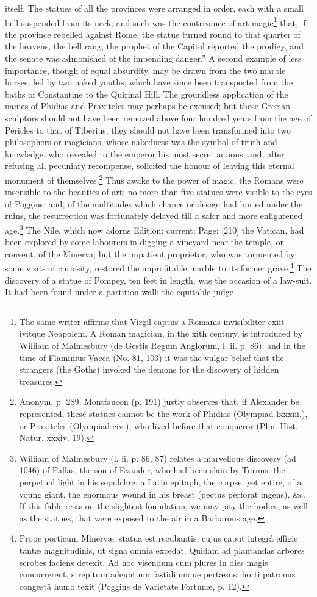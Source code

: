 itself. The statues of all the provinces were arranged in order, each with a small bell suspended from its neck; and such was the contrivance of art-magic\footnote{The same writer affirms that Virgil captus a Romanis invisibiliter exiit ivitque Neapolem. A Roman magician, in the xith century, is introduced by William of Malmesbury (de Gestis Regum Anglorum, l. ii. p. 86); and in the time of Flaminius Vacca (No. 81, 103) it was the vulgar belief that the strangers (the Goths) invoked the demons for the discovery of hidden treasures.} that, if the province rebelled against Rome, the statue turned round to that quarter of the heavens, the bell rang, the prophet of the Capitol reported the prodigy, and the senate was admonished of the impending danger.\texthebrew{}” A second example of less importance, though of equal absurdity, may be drawn from the two marble horses, led by two naked youths, which have since been transported from the baths of Constantine to the Quirinal Hill. The groundless application of the names of Phidias and Praxiteles may perhaps be excused; but these Grecian sculptors should not have been removed above four hundred years from the age of Pericles to that of Tiberius; they should not have been transformed into two philosophers or magicians, whose nakedness was the symbol of truth and knowledge, who revealed to the emperor his most secret actions, and, after refusing all pecuniary recompense, solicited the honour of leaving this eternal monument of themselves.\footnote{Anonym. p. 289. Montfaucon (p. 191) justly observes that, if Alexander be represented, these statues cannot be the work of Phidias (Olympiad lxxxiii.), or Praxiteles (Olympiad civ.), who lived before that conqueror (Plin. Hist. Natur. xxxiv. 19).} Thus awake to the power of magic, the Romans were insensible to the beauties of art: no more than five statues were visible to the eyes of Poggius; and, of the multitudes which chance or design had buried under the ruins, the resurrection was fortunately delayed till a safcr and more enlightened age.\footnote{William of Malmesbury (l. ii. p. 86, 87) relates a marvellous discovery (ad 1046) of Pallas, the son of Evander, who had been slain by Turnus: the perpetual light in his sepulchre, a Latin epitaph, the corpse, yet entire, of a young giant, the enormous wound in his breast (pectus perforat ingens), \&c. If this fable rests on the slightest foundation, we may pity the bodies, as well as the statues, that were exposed to the air in a Barbarous age.} The Nile, which now adorns Edition: current; Page: [210] the Vatican, had been explored by some labourers in digging a vineyard near the temple, or convent, of the Minerva; but the impatient proprietor, who was tormented by some visits of curiosity, restored the unprofitable marble to its former grave.\footnote{Prope porticum Minervæ, statua est recubantis, cujus caput integrâ effigie tantæ magnitudinis, ut signa omnia excedat. Quidam ad plantandas arbores scrobes faciens detexit. Ad hoc visendum cum plures in dies magis concurrerent, strepitum adeuntium fastidiumque pertæsus, horti patronus congestâ humo texit (Poggius de Varietate Fortunæ, p. 12).} The discovery of a statue of Pompey, ten feet in length, was the occasion of a law-suit. It had been found under a partition-wall: the equitable judge 